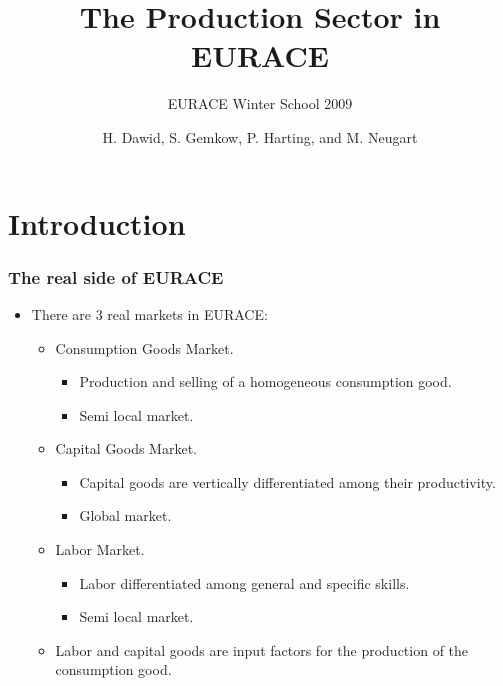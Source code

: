 \documentclass{beamer}
\title{The Production Sector in EURACE}
\subtitle{EURACE Winter School 2009}
\author{H. Dawid, S. Gemkow, P.
Harting, and M. Neugart}
\begin{document}
\frame{\titlepage}

\section[Overview]{}
\frame{\tableofcontents}

\section{Introduction}





\frame
{
  \frametitle{The real side of EURACE} 

\begin{itemize}

\item There are 3 real markets in EURACE:
		
		\begin{itemize}
				\item Consumption Goods Market.
				\begin{itemize}
					\item Production and selling of a homogeneous consumption good.
		\item Semi local market.
		\end{itemize}
		
		\item Capital Goods Market.
		
	\begin{itemize}
		\item Capital goods are vertically differentiated among their productivity. 
		\item Global market.
	 

	\end{itemize}
		\item Labor Market.
		\begin{itemize}
	\item  Labor differentiated among general and specific skills.
	\item Semi local market.
\end{itemize}

	\item Labor and capital goods are input factors for the production of the consumption good.

		\end{itemize}
\end{itemize}	

}
\end{document}
